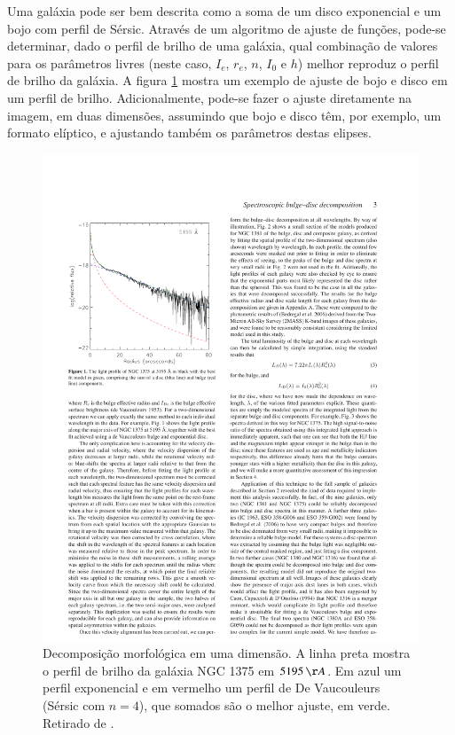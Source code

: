 Uma galáxia pode ser bem descrita como a soma de um disco exponencial e um bojo
com perfil de Sérsic. Através de um algoritmo de ajuste de funções, pode-se
determinar, dado o perfil de brilho de uma galáxia, qual combinação de valores
para os parâmetros livres (neste caso, $I_e$, $r_e$, $n$, $I_0$ e $h$) melhor
reproduz o perfil de brilho da galáxia. A figura \ref{fig:decompJohnston} mostra
um exemplo de ajuste de bojo e disco em um perfil de brilho.
Adicionalmente, pode-se fazer o ajuste diretamente na imagem, em duas dimensões,
assumindo que bojo e disco têm, por exemplo, um formato elíptico, e ajustando
também os parâmetros destas elipses.

\begin{figure}
	\includegraphics{figuras/johnston-decomp}
	\caption[Decomposição morfológica em uma dimensão] {Decomposição morfológica
	em uma dimensão. A linha preta mostra o perfil de brilho da galáxia NGC
	1375 em $5195\,\AA$. Em azul um perfil exponencial e em vermelho um
	perfil de De Vaucouleurs (Sérsic com $n=4$), que somados são o melhor
	ajuste, em verde. Retirado de \citet{Johnston2012}.}
	\label{fig:decompJohnston}
\end{figure}

